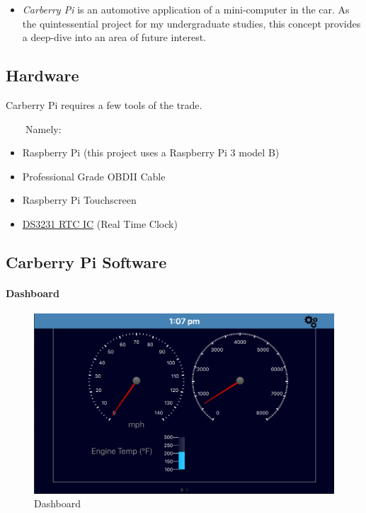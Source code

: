 \documentclass{article}
\begin{document}
\begin{itemize}
\tightlist
\item
  \emph{Carberry Pi} is an automotive application of a mini-computer in
  the car. As the quintessential project for my undergraduate studies,
  this concept provides a deep-dive into an area of future interest.
\end{itemize}

\hypertarget{hardware}{%
\subsection{Hardware}\label{hardware}}

Carberry Pi requires a few tools of the trade.

~~~~Namely:

\begin{itemize}
\item
  Raspberry Pi (this project uses a Raspberry Pi 3 model B)
\item
  Professional Grade OBDII Cable
\item
  Raspberry Pi Touchscreen
\item
 \href{https://thepihut.com/products/mini-rtc-module-for-raspberry-pi}{DS3231 RTC IC}
  (Real Time Clock)
\end{itemize}

\hypertarget{carberry-pi-software}{%
\subsection{Carberry Pi Software}\label{carberry-pi-software}}

\hypertarget{dashboard}{%
\paragraph{Dashboard}\label{dashboard}}

\begin{figure}
\centering
\includegraphics{./resources/dash.png}
\caption{Dashboard}
\end{figure}
\end{document}
